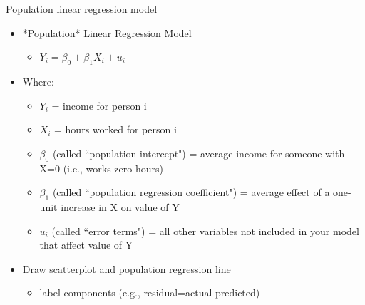 \begin{frame}{Population linear regression model}
	\begin{itemize}
	\item *Population* Linear Regression Model
		\begin{itemize}
		\item $Y_{i} = \beta_{0} + \beta_{1}X_{i} + u_{i}$
		\end{itemize}
	\item Where:
		\begin{itemize}
		\item $Y_{i}$ = income for person i 
		\item $ X_{i}$ = hours worked for person i 
		\item $ \beta_{0}$ (called ``population intercept") = average income for someone with X=0 (i.e., works zero hours)
		\item $ \beta_{1}$ (called ``population regression coefficient") = average effect of a one-unit increase in X on value of Y
		\item $u_{i}$ (called ``error terms") = all other variables not included in your model that affect value of Y
		\end{itemize}
	\vspace{3mm}
	\item Draw scatterplot and population regression line
		\begin{itemize}
			\item label components (e.g., residual=actual-predicted)
		\end{itemize}
	\end{itemize}
\end{frame}

